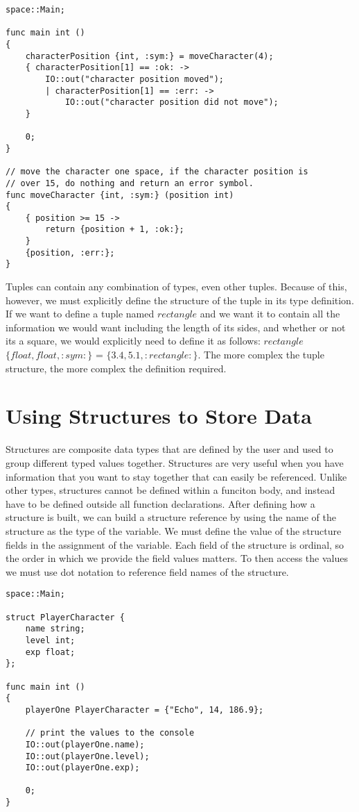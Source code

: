 \documentclass{article}
\begin{document}
\begin{lstlisting}
space::Main;

func main int ()
{
	characterPosition {int, :sym:} = moveCharacter(4);
 	{ characterPosition[1] == :ok: ->
  		IO::out("character position moved");
    	| characterPosition[1] == :err: ->
     		IO::out("character position did not move");
	}

	0;
}

// move the character one space, if the character position is
// over 15, do nothing and return an error symbol.
func moveCharacter {int, :sym:} (position int)
{
	{ position >= 15 ->
 		return {position + 1, :ok:};
	}
 	{position, :err:};
}
\end{lstlisting}

Tuples can contain any combination of types, even other tuples. Because of this, however, we must explicitly define the structure of the tuple in its type definition. If
we want to define a tuple named $rectangle$ and we want it to contain all the information we would want including the length of its sides, and whether or not its a square,
we would explicitly need to define it as follows: $rectangle$ $\{float, float, :sym:\}$ = $\{3.4, 5.1, :rectangle:\}$. The more complex the tuple structure, the more complex the
definition required.


\section{Using Structures to Store Data}

Structures are composite data types that are defined by the user and used to group different typed values together. Structures are very useful when you have information
that you want to stay together that can easily be referenced. Unlike other types, structures cannot be defined within a funciton body, and instead have to be defined outside all
function declarations. After defining how a structure is built, we can build a structure reference by using the name of the structure as the type of the variable. We must
define the value of the structure fields in the assignment of the variable. Each field of the structure is ordinal, so the order in which we provide
the field values matters. To then access the values we must use dot notation to reference field names of the structure.

\begin{lstlisting}
space::Main;

struct PlayerCharacter {
	name string;
	level int;
	exp float;
};

func main int ()
{
	playerOne PlayerCharacter = {"Echo", 14, 186.9};

	// print the values to the console
	IO::out(playerOne.name);
	IO::out(playerOne.level);
	IO::out(playerOne.exp);

	0;
}
\end{lstlisting}
\end{document}
